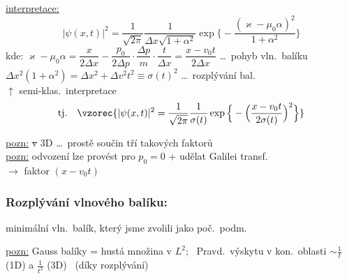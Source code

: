 \underline{interpretace:}
\[
  |\psi(x,t)|^2 = \frac{1}{\sqrt{2\pi}}\frac{1}{\Delta x\sqrt{1+\alpha^2}}\exp\Big\{-\frac{(\varkappa-\mu_0\alpha)^2}{1+\alpha^2}\Big\}
\]
kde: \quad $\varkappa - \mu_0\alpha = \dfrac{x}{2\Delta x} - \dfrac{p_0}{2\Delta p}\cdot\dfrac{\Delta p}{m}\cdot\dfrac{t}{\Delta x} = \dfrac{x - v_0t}{2\Delta x}$ \quad \dots\ pohyb vln.\ balíku \\[3pt]
\quad $\Delta x^2(1+\alpha^2) = \Delta x^2 + \Delta v^2t^2 \equiv \sigma(t)^2$ \quad \dots\ rozplývání bal. \\
\hspace*{9.5cm} $\uparrow$ semi-klas.\ interpretace
\[
  \text{tj.}\quad \vzorec{|\psi(x,t)|^2 = \frac{1}{\sqrt{2\pi}}\frac{1}{\sigma(t)}\exp\Big\{-\Big(\frac{x - v_0t}{2\sigma(t)}\Big)^2\Big\}}
\]

\underline{pozn:} \sout{v} 3D \dots\ prostě součin tří takových faktorů \\
\underline{pozn:} odvození lze provést pro $p_0 = 0$ + udělat Galilei transf. \\
\quad $\to$ faktor $(x - v_0t)$

\begin{minipage}{0.45\textwidth}
\subsubsection*{Rozplývání vlnového balíku:}
\vspace{1.2cm}
{\color{red}minimální vln.\ balík, který jsme zvolili jako poč.\ podm.}
\end{minipage}
\begin{minipage}{0.53\textwidth}
\end{minipage}

\underline{pozn:} Gauss balíky = hustá množina v $L^2$; \ Pravd.\ výskytu v kon.\ oblasti $\sim\frac1t$ (1D) a $\frac{1}{t^3}$ (3D) \ (díky rozplývání)

